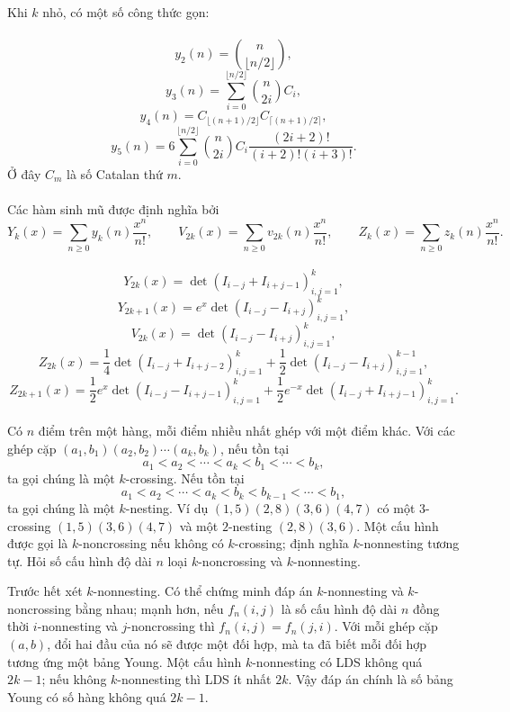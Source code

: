 \documentclass[11pt]{article}
\begin{document}
Khi \(k\) nhỏ, có một số công thức gọn:

\paragraph{}
\[
y_2(n)=\binom{n}{\lfloor n/2\rfloor},
\]
\[
y_3(n)=\sum_{i=0}^{\lfloor n/2\rfloor}\binom{n}{2i}C_i,
\]
\[
y_4(n)=C_{\lfloor(n+1)/2\rfloor}C_{\lceil(n+1)/2\rceil},
\]
\[
y_5(n)=6\sum_{i=0}^{\lfloor n/2\rfloor}
\binom{n}{2i}C_i
\frac{(2i+2)!}{(i+2)!(i+3)!}.
\]
Ở đây \(C_m\) là số Catalan thứ \(m\).

\paragraph{}
Các hàm sinh mũ được định nghĩa bởi
\[
Y_k(x)=\sum_{n\ge0}y_k(n)\frac{x^n}{n!},\qquad
V_{2k}(x)=\sum_{n\ge0}v_{2k}(n)\frac{x^n}{n!},\qquad
Z_k(x)=\sum_{n\ge0}z_k(n)\frac{x^n}{n!}.
\]

\paragraph{}
\[
Y_{2k}(x)=\det(I_{i-j}+I_{i+j-1})_{i,j=1}^k,
\]
\[
Y_{2k+1}(x)=e^x\det(I_{i-j}-I_{i+j})_{i,j=1}^k,
\]
\[
V_{2k}(x)=\det(I_{i-j}-I_{i+j})_{i,j=1}^k,
\]
\[
Z_{2k}(x)=\frac14\det(I_{i-j}+I_{i+j-2})_{i,j=1}^k
+\frac12\det(I_{i-j}-I_{i+j})_{i,j=1}^{k-1},
\]
\[
Z_{2k+1}(x)=\frac12 e^x\det(I_{i-j}-I_{i+j-1})_{i,j=1}^k
+\frac12 e^{-x}\det(I_{i-j}+I_{i+j-1})_{i,j=1}^k.
\]

\paragraph{}
Có \(n\) điểm trên một hàng, mỗi điểm nhiều nhất ghép với một điểm khác. Với
các ghép cặp \((a_1,b_1)(a_2,b_2)\cdots(a_k,b_k)\), nếu tồn tại
\[
a_1<a_2<\cdots<a_k<b_1<\cdots<b_k,
\]
ta gọi chúng là một \(k\)-crossing. Nếu tồn tại
\[
a_1<a_2<\cdots<a_k<b_k<b_{k-1}<\cdots<b_1,
\]
ta gọi chúng là một \(k\)-nesting. Ví dụ
\((1,5)(2,8)(3,6)(4,7)\) có một \(3\)-crossing
\((1,5)(3,6)(4,7)\) và một \(2\)-nesting \((2,8)(3,6)\). Một cấu hình được
gọi là \(k\)-noncrossing nếu không có \(k\)-crossing; định nghĩa
\(k\)-nonnesting tương tự. Hỏi số cấu hình độ dài \(n\) loại \(k\)-noncrossing
và \(k\)-nonnesting.

Trước hết xét \(k\)-nonnesting. Có thể chứng minh đáp án \(k\)-nonnesting và
\(k\)-noncrossing bằng nhau; mạnh hơn, nếu \(f_n(i,j)\) là số cấu hình độ dài
\(n\) đồng thời \(i\)-nonnesting và \(j\)-noncrossing thì
\(f_n(i,j)=f_n(j,i)\). Với mỗi ghép cặp \((a,b)\), đổi hai đầu của nó sẽ được
một đối hợp, mà ta đã biết mỗi đối hợp tương ứng một bảng Young. Một cấu hình
\(k\)-nonnesting có LDS không quá \(2k-1\); nếu không \(k\)-nonnesting thì LDS
ít nhất \(2k\). Vậy đáp án chính là số bảng Young có số hàng không quá
\(2k-1\).
\end{document}
